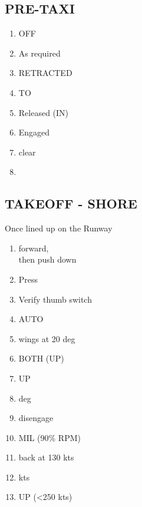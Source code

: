 \documentclass[8pt,usenames,dvipsnames,twoside]{article}
\begin{document}
\begin{multicols*}{2}
		\cleardoublepage
		
		\subsection{PRE-TAXI}
		\begin{enumerate}
			\item {} \dotfill OFF
			\item {} \dotfill As required
			\item {} \dotfill RETRACTED
			\item {} \dotfill TO
			\item {} \dotfill Released (IN)
			\item {} \dotfill Engaged
			\item {} \dotfill clear 
			\item {}
		\end{enumerate}
	
		\subsection{TAKEOFF - SHORE}
		Once lined up on the Runway
		\begin{enumerate}
			\item {} \dotfill forward,\\
			\hfill then push down
			\item {} \dotfill Press
			\item {} \dotfill Verify thumb switch
			\item {} \dotfill AUTO
			\item {} \dotfill wings at 20 deg
			\item {} \dotfill BOTH (UP)
			\item {} \dotfill UP
			\item {}  deg
			\item {} \dotfill disengage
			\item {} \dotfill MIL (90\% RPM) 
			\item {} \dotfill back at 130 kts
			\item {}  kts
			\item {} \dotfill UP (<250 kts)
		\end{enumerate}
	

\end{multicols*}
\end{document}
